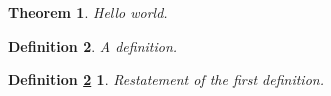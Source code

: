 \documentclass{article}
\newtheorem{theorem}{Theorem}
\newtheorem{definition}[theorem]{Definition}
\newtheorem*{def31}{Definition \ref{def:afb}}
\begin{document}
\begin{theorem}
  Hello world.
\end{theorem}
\begin{definition}\label{def:afb}
  A definition.
\end{definition}
\begin{def31}
  Restatement of the first definition.
\end{def31}
\end{document}
